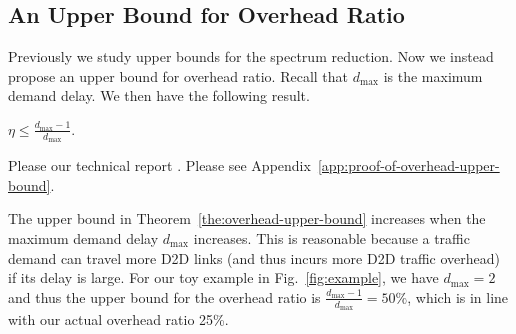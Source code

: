 \subsection{An Upper Bound for Overhead Ratio}
Previously we study upper bounds for the spectrum reduction. Now
we instead propose an upper bound for overhead ratio. Recall that
$d_{\max}$ is the maximum demand delay. We then have the following result.

\begin{comment}
We further denote
\be
R^{\textsf{D2D}}_{\max} \triangleq \max_{(u,v) \in \mathcal{E}: (u,v) \text{ is a D2D link }} R_{u,v},
\ee
as the maximum D2D link rate.
\end{comment}

\begin{theorem} \label{the:overhead-upper-bound}
$\eta \le \frac{d_{\max}-1}{d_{\max}}$.
\end{theorem}
\begin{IEEEproof}
\ifx \ISTR \undefined
Please our technical report \cite{TR}.
\else
Please see Appendix~\ref{app:proof-of-overhead-upper-bound}.
\fi
\end{IEEEproof}

The upper bound in Theorem~\ref{the:overhead-upper-bound} increases when the maximum
demand delay $d_{\max}$ increases. This is reasonable because a traffic demand can travel more
D2D links (and thus incurs more D2D traffic overhead) if its delay is large.
For our toy example in Fig.~\ref{fig:example}, we have $d_{\max}=2$ and thus
the upper bound for the overhead ratio is $\frac{d_{\max}-1}{d_{\max}}=50\%$, which
is in line with our actual overhead ratio 25\%.


\begin{comment}
\begin{theorem}
$\eta \le \frac{F^{\textsf{D2D}} R^{\textsf{D2D}}_{\max} (d_{\max}-1)}{F^{\textsf{D2D}} R^{\textsf{D2D}}_{\max} (d_{\max}-1) + V^{\textsf{BS}}}$.
\end{theorem}
\begin{IEEEproof}
According to \eqref{equ:D2D-traffic}, we have
\bee
V^{\textsf{D2D}} & = \sum_{t=1}^{T} \sum_{j \in \mathcal{J}: t \in [s_j, e_j-1]}
\sum_{u \in \mathcal{U}} \sum_{v:v \in \mathcal{U}, (u,v) \in \mathcal{E}} x^{j}_{u,v}(t) {R_{u,v}} \nnb \\
& = \sum_{j \in \mathcal{J}} \sum_{t=s_j}^{e_j-1} \sum_{u \in \mathcal{U}} \sum_{v:v \in \mathcal{U}, (u,v) \in \mathcal{E}} x^{j}_{u,v}(t) {R_{u,v}} \nnb \\
& \le \sum_{j \in \mathcal{J}} \sum_{t=s_j}^{e_j-1} R^{\textsf{D2D}}_{\max} \sum_{u \in \mathcal{U}} \sum_{v:v \in \mathcal{U}, (u,v) \in \mathcal{E}} x^{j}_{u,v}(t) \nnb \\
& = \sum_{j \in \mathcal{J}} \sum_{t=s_j}^{e_j-1} R^{\textsf{D2D}}_{\max} F^{\textsf{D2D}} \nnb \\
& = \sum_{j \in \mathcal{J}} R^{\textsf{D2D}}_{\max} F^{\textsf{D2D}}
\eee
\red{there are some problems about the proof...}
\end{IEEEproof}
\end{comment}
